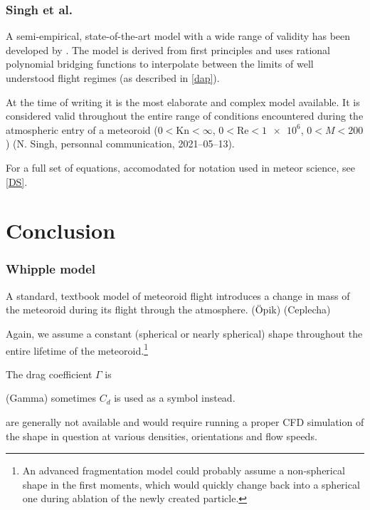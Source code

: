         \subsubsection{Singh et al.} \label{ddS}
            A semi-empirical, state-of-the-art model with a wide range of validity has been developed by
            \citet{singh+2020}. The model is derived from first principles and
            uses rational polynomial bridging functions to interpolate between
            the limits of well understood flight regimes (as described in \cref{dap}).

            At the time of writing it is the most elaborate and complex model available.
            It is considered valid throughout the entire range of
            conditions encountered during the atmospheric entry of a meteoroid
            ($0 < \mathrm{Kn} < \infty$, $0 < \mathrm{Re} < \num{1e6}$, $0 < M < 200$)
            (N. Singh, personnal communication, 2021--05--13).

            For a full set of equations, accomodated for notation used in meteor science, see \cref{DS}.

\section{Conclusion} \label{dc}

    \subsubsection{Whipple model} \label{mmw}
        A standard, textbook model of meteoroid flight introduces a change in mass of the meteoroid
        during its flight through the atmosphere. 
        (Öpik) (Ceplecha)

        Again, we assume a constant (spherical or nearly spherical) shape throughout the entire
        lifetime of the meteoroid.\footnote{An advanced fragmentation model could probably assume a non-spherical
        shape in the first moments, which would quickly change back into a spherical one during ablation
        of the newly created particle.}

        The drag coefficient $\Gamma$ is 

        (Gamma) sometimes $C_d$ is used as a symbol instead.

        are generally not available and would require running a proper CFD simulation
        of the shape in question at various densities, orientations and flow speeds.

